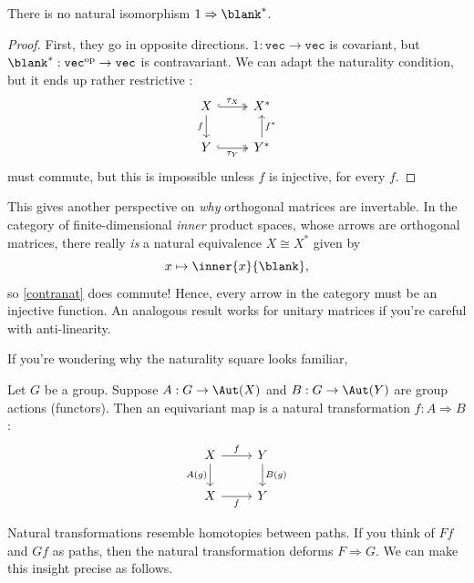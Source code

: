 \documentclass[a5paper]{scrartcl}
\def\veccat{\texttt{vec}}
\begin{document}
\begin{theorem}
  There is no natural isomorphism \(1 \Rightarrow \blank^*\).
\end{theorem}
\begin{proof}
  First, they go in opposite directions. \(1:\veccat \to \veccat\) is covariant, but
  \(\blank^* : \veccat^{\text{op}} \to \veccat \) is contravariant. We can adapt the naturality condition, but it ends up rather restrictive \cite[234]{natural-equivalence}:
  \begin{equation}
    \begin{tikzcd}
      X\rar[hook, two heads]{\tau_X}\dar[swap]{f} & X^* \\
      Y\rar[hook, two heads,swap]{\tau_Y} & Y^*\uar[swap]{f^*}
    \end{tikzcd}
    \label{contranat}
  \end{equation}
  must commute,
  but this is impossible unless \(f\) is injective, for every \(f\).
\end{proof}
This gives another perspective on \emph{why} orthogonal matrices are invertable. In the category of finite-dimensional \emph{inner} product spaces, whose arrows are orthogonal matrices, there really \emph{is} a natural equivalence \(X\cong X^*\) given by
\[
  x\mapsto \inner{x}{\blank},
\]
so \cref{contranat} does commute! Hence, every arrow in the category must be an injective function. An analogous result works for unitary matrices if you're careful with anti-linearity.

If you're wondering why the naturality square looks familiar,
\begin{defn}
  Let \(G\) be a group. Suppose \(A: G \to \Aut(X)\) and \(B: G \to \Aut(Y)\) are group actions (functors). Then an equivariant map is a natural transformation \(f: A \Rightarrow B\):
  \[
    \begin{tikzcd}
      X \dar[swap]{A(g)}\rar{f} & Y\dar{B(g)} \\
      X\rar[swap]{f} & Y
    \end{tikzcd}
  \]
\end{defn}

Natural transformations resemble homotopies between paths. If you think of \(Ff\) and \(Gf\) as paths, then the natural transformation deforms \(F\Rightarrow G\). We can make this insight precise as follows.
\end{document}
